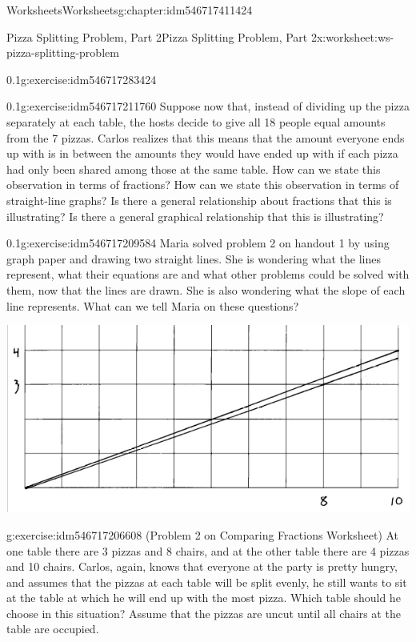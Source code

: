 \documentclass[twoside,11pt,]{book}
\begin{document}
\begin{chapterptx}{Worksheets}{}{Worksheets}{}{}{g:chapter:idm546717411424}
\begin{worksheet-section-numberless}{Pizza Splitting Problem, Part 2}{}{Pizza Splitting Problem, Part 2}{}{}{x:worksheet:ws-pizza-splitting-problem}
\begin{divisionexercise}{1}{}{0.1}{g:exercise:idm546717283424}
\end{divisionexercise}%
\begin{divisionexercise}{2}{}{0.1}{g:exercise:idm546717211760}%
Suppose now that, instead of dividing up the pizza separately at each table, the hosts decide to give all 18 people equal amounts from the 7 pizzas.  Carlos realizes that this means that the amount everyone ends up with is in between the amounts they would have ended up with if each pizza had only been shared among those at the same table.  How can we state this observation in terms of fractions?  How can we state this observation in terms of straight-line graphs?  Is there a general relationship about fractions that this is illustrating?  Is there a general graphical relationship that this is illustrating?%
\end{divisionexercise}%
\clearpage
\begin{divisionexercise}{3}{}{0.1}{g:exercise:idm546717209584}%
Maria solved problem 2 on handout 1 by using graph paper and drawing two straight lines.  She is wondering what the lines represent, what their equations are and what other problems could be solved with them, now that the lines are drawn.  She is also wondering what the slope of each line represents.  What can we tell Maria on these questions?%
\begin{sidebyside}{1}{0.05}{0.05}{0}%
\begin{sbspanel}{0.9}%
\includegraphics[width=1\linewidth]{images/pizza-splitting-problem.png}
\end{sbspanel}%
\end{sidebyside}%
\end{divisionexercise}%
\begin{divisionexercise}{4}{}{}{g:exercise:idm546717206608}%
(Problem 2 on Comparing Fractions Worksheet) At one table there are 3 pizzas and 8 chairs, and at the other table there are 4 pizzas and 10 chairs.  Carlos, again, knows that everyone at the party is pretty hungry, and assumes that the pizzas at each table will be split evenly, he still wants to sit at the table at which he will end up with the most pizza.  Which table should he choose in this situation? Assume that the pizzas are uncut until all chairs at the table are occupied.%

\end{divisionexercise}
\end{worksheet-section-numberless}
\end{chapterptx}
\end{document}
